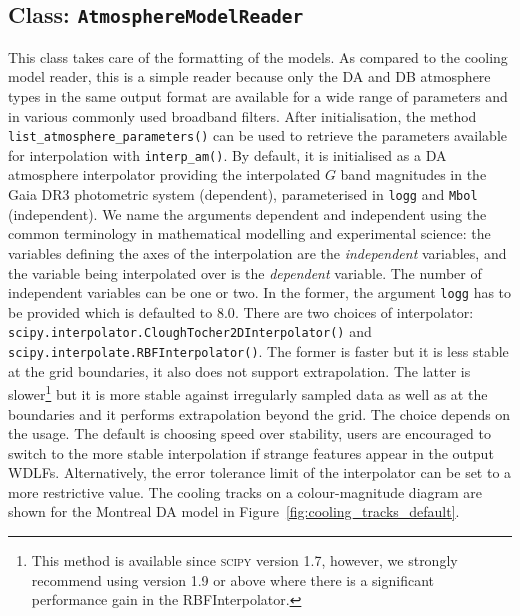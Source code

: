 \documentclass[fleqn,usenatbib]{rasti}
\begin{document}
\subsection{Class: \texttt{AtmosphereModelReader}}
This class takes care of the formatting of the models. As compared to the
cooling model reader, this is a simple reader because only the DA and DB
atmosphere types in the same output format are available for a wide range of
parameters and in various commonly used broadband filters. After initialisation,
the method \verb+list_atmosphere_parameters()+ can be used to retrieve the
parameters available for interpolation with \verb+interp_am()+. By default, it
is initialised as a DA atmosphere interpolator providing the interpolated $G$
band magnitudes in the Gaia DR3 photometric system (dependent), parameterised
in \verb+logg+ and \verb+Mbol+ (independent). We name the arguments dependent
and independent using the common terminology in mathematical modelling and
experimental science: the variables defining the axes of the interpolation are
the \textit{independent} variables, and the variable being interpolated over
is the \textit{dependent} variable. The number of independent variables can be
one or two. In the former, the argument \verb+logg+ has to be provided which
is defaulted to $8.0$. There are two choices of interpolator:
\verb+scipy.interpolator.CloughTocher2DInterpolator()+ and 
\verb+scipy.interpolate.RBFInterpolator()+. The former is faster but it is less
stable at the grid boundaries, it also does not support extrapolation. The
latter is slower\footnote{This method is available since \textsc{scipy}
version 1.7, however, we strongly recommend using version 1.9 or above where
there is a significant performance gain in the RBFInterpolator.} but it is more
stable against irregularly sampled data as well as at the boundaries and it
performs extrapolation beyond the grid. The choice depends on the usage. The
default is choosing speed over stability, users are encouraged to switch to
the more stable interpolation if strange features appear in the output WDLFs.
Alternatively, the error tolerance limit of the interpolator can be set to a
more restrictive value. The cooling tracks on a colour-magnitude diagram are
shown for the Montreal DA model in Figure~\ref{fig:cooling_tracks_default}.
\end{document}
